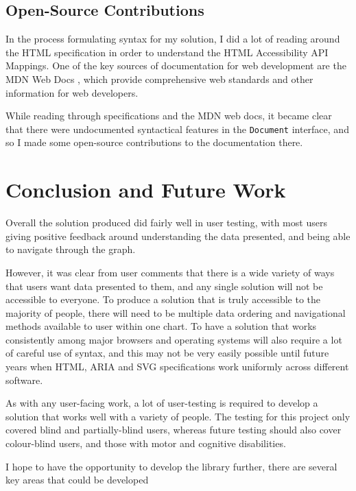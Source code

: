\documentclass[ %
                    author={Aleena Baig},
                supervisor={Dr Simon Lock},
                    degree={BSc},
                     title={On Making Web Accessible Graphs},
                  subtitle={},
                      year={2019} ]{dissertation}
\begin{document}
\section{Open-Source Contributions}

In the process formulating syntax for my solution, I did a lot of reading around the HTML specification \cite{htmlspec} in order to understand the HTML Accessibility API Mappings. One of the key sources of documentation for web development are the MDN Web Docs \cite{mdndocs}, which provide comprehensive web standards and other information for web developers.

While reading through specifications and the MDN web docs, it became clear that there were undocumented syntactical features in the \texttt{Document} interface, and so I made some open-source contributions to the documentation there.


\chapter{Conclusion and Future Work}

Overall the solution produced did fairly well in user testing, with most users giving positive feedback around understanding the data presented, and being able to navigate through the graph.

However, it was clear from user comments that there is a wide variety of ways that users want data presented to them, and any single solution will not be accessible to everyone. To produce a solution that is truly accessible to the majority of people, there will need to be multiple data ordering and navigational methods available to user within one chart. To have a solution that works consistently among major browsers and operating systems will also require a lot of careful use of syntax, and this may not be very easily possible until future years when HTML, ARIA and SVG specifications work uniformly across different software.

As with any user-facing work, a lot of user-testing is required to develop a solution that works well with a variety of people. The testing for this project only covered blind and partially-blind users, whereas future testing should also cover colour-blind users, and those with motor and cognitive disabilities.

I hope to have the opportunity to develop the library further, there are several key areas that could be developed
\end{document}
